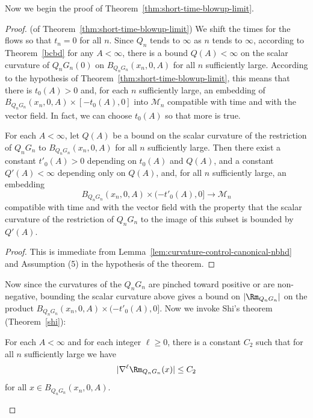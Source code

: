Now we begin the proof of Theorem~\ref{thm:short-time-blowup-limit}.



\begin{proof}(of Theorem~\ref{thm:short-time-blowup-limit})
We shift the times for the flows so that $t_n=0$ for all $n$. Since
$Q_n$ tends to $\infty$ as $n$ tends to $\infty$, according to
Theorem~\ref{bcbd} for any $A<\infty$, there is a bound
$Q(A)<\infty$ on the scalar curvature of $Q_nG_n(0)$ on
$B_{Q_nG_n}(x_n,0,A)$  for all $n$ sufficiently large. According to
the hypothesis of Theorem~\ref{thm:short-time-blowup-limit}, this means that there is
$t_0(A)>0$ and, for each $n$ sufficiently large, an embedding of
$B_{Q_nG_n}(x_n,0,A)\times [-t_0(A),0]$ into ${\mathcal M}_n$
compatible with time and with the vector field. In fact, we can
choose $t_0(A)$ so that more is true.

\begin{corollary}
\label{cor:uniform-backward-curvature-bound}
\label{cnnbhd2}
For each $A<\infty$, let $Q(A)$ be a bound  on the  scalar curvature
of the restriction of $Q_nG_n$ to  $B_{Q_nG_n}(x_n,0,A)$ for all $n$
sufficiently large. Then there exist a constant  $t'_0(A)>0$
depending on $t_0(A)$ and $Q(A)$, and a constant $Q'(A)<\infty$
depending only on $Q(A)$, and, for all $n$ sufficiently large, an
embedding
$$B_{Q_nG_n}(x_n,0,A)\times (-t'_0(A),0]\to{\mathcal
M}_n$$ compatible with time and with the vector field with the
property that  the scalar curvature of the restriction of $Q_nG_n$
to the image of this subset is bounded by $Q'(A)$.
\end{corollary}

\begin{proof}
This is immediate from  Lemma~\ref{lem:curvature-control-canonical-nbhd} and Assumption (5)
in the hypothesis of the theorem.
\end{proof}

Now since the curvatures of the $Q_nG_n$ are pinched toward positive
or are non-negative, bounding the scalar curvature above gives a
bound on $|\Rm_{Q_nG_n}|$ on the product
$B_{Q_nG_n}(x_n,0,A)\times (-t'_0(A),0]$. Now we invoke Shi's
theorem (Theorem~\ref{shi}):

\begin{corollary}
\label{cor:shi-bound-blowup-sequence}
For each $A<\infty$ and for each integer $\ell\ge 0$, there is a
constant $C_2$ such that for all $n$ sufficiently large we have
$$|\nabla^\ell\Rm_{Q_nG_n}(x)|\le C_2$$ for all $x\in
B_{Q_nG_n}(x_n,0,A) $.
\end{corollary}



\end{proof}
